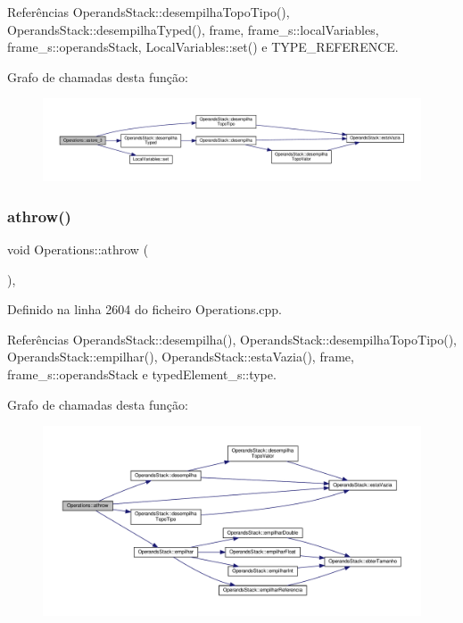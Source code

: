 Referências Operands\+Stack\+::desempilha\+Topo\+Tipo(), Operands\+Stack\+::desempilha\+Typed(), frame, frame\+\_\+s\+::local\+Variables, frame\+\_\+s\+::operands\+Stack, Local\+Variables\+::set() e T\+Y\+P\+E\+\_\+\+R\+E\+F\+E\+R\+E\+N\+CE.

Grafo de chamadas desta função\+:\nopagebreak
\begin{figure}[H]
\begin{center}
\leavevmode
\includegraphics[width=350pt]{classOperations_ac3c02b3ff78b6222bd58bebb4f01c083_cgraph}
\end{center}
\end{figure}
\mbox{\label{classOperations_a2a5eea0fb18391bb3854dfe55c8ac5d3}} 
\subsubsection{\texorpdfstring{athrow()}{athrow()}}
{\footnotesize\ttfamily void Operations\+::athrow (\begin{DoxyParamCaption}{ }\end{DoxyParamCaption})\hspace{0.3cm}{\ttfamily [static]}, {\ttfamily [private]}}



Definido na linha 2604 do ficheiro Operations.\+cpp.



Referências Operands\+Stack\+::desempilha(), Operands\+Stack\+::desempilha\+Topo\+Tipo(), Operands\+Stack\+::empilhar(), Operands\+Stack\+::esta\+Vazia(), frame, frame\+\_\+s\+::operands\+Stack e typed\+Element\+\_\+s\+::type.

Grafo de chamadas desta função\+:\nopagebreak
\begin{figure}[H]
\begin{center}
\leavevmode
\includegraphics[width=350pt]{classOperations_a2a5eea0fb18391bb3854dfe55c8ac5d3_cgraph}
\end{center}
\end{figure}
\mbox{\label{classOperations_a705efecd2a658615f2dfe777f0bd7032}} 

